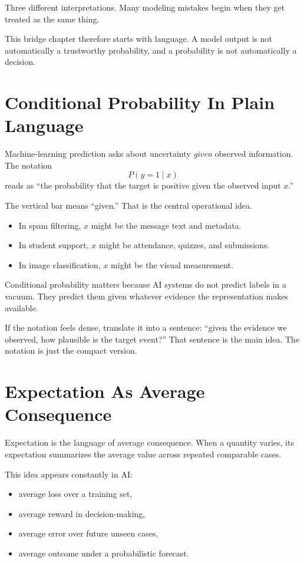 Three different interpretations. Many modeling mistakes begin when they get treated as the same thing.

This bridge chapter therefore starts with language. A model output is not automatically a trustworthy probability, and a probability is not automatically a decision.

\section*{Conditional Probability In Plain Language}

Machine-learning prediction asks about uncertainty \emph{given} observed information. The notation
\[
P(y=1 \mid x)
\]
reads as ``the probability that the target is positive given the observed input \(x\).''

The vertical bar means ``given.'' That is the central operational idea.

\begin{itemize}[leftmargin=*]
\item In spam filtering, \(x\) might be the message text and metadata.
\item In student support, \(x\) might be attendance, quizzes, and submissions.
\item In image classification, \(x\) might be the visual measurement.
\end{itemize}

Conditional probability matters because AI systems do not predict labels in a vacuum. They predict them given whatever evidence the representation makes available.

If the notation feels dense, translate it into a sentence: ``given the evidence we observed, how plausible is the target event?'' That sentence is the main idea. The notation is just the compact version.

\section*{Expectation As Average Consequence}

Expectation is the language of average consequence. When a quantity varies, its expectation summarizes the average value across repeated comparable cases.

This idea appears constantly in AI:

\begin{itemize}[leftmargin=*]
\item average loss over a training set,
\item average reward in decision-making,
\item average error over future unseen cases,
\item average outcome under a probabilistic forecast.
\end{itemize}

